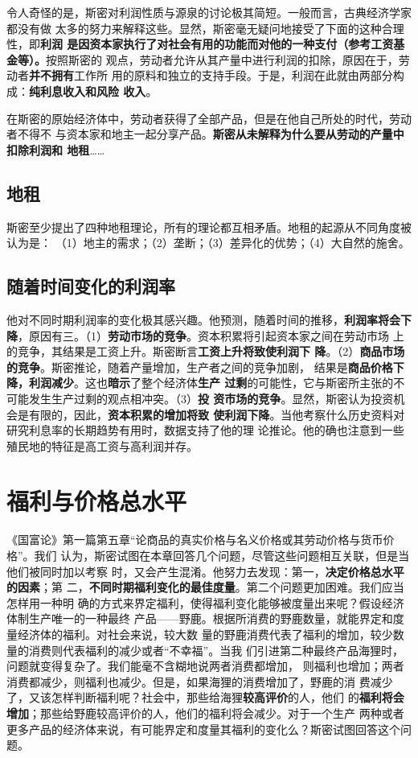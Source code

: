 令人奇怪的是，斯密对利润性质与源泉的讨论极其简短。一般而言，古典经济学家都没有做
太多的努力来解释这些。显然，斯密毫无疑问地接受了下面的这种合理性，即\textbf{利润
  是因资本家执行了对社会有用的功能而对他的一种支付（参考工资基金等）。}按照斯密的
观点，劳动者允许从其产量中进行利润的扣除，原因在于，劳动者\textbf{并不拥有}工作所
用的原料和独立的支持手段。于是，利润在此就由两部分构成：\textbf{纯利息收入和风险
  收入}。

在斯密的原始经济体中，劳动者获得了全部产品，但是在他自己所处的时代，劳动者不得不
与资本家和地主一起分享产品。\textbf{斯密从未解释为什么要从劳动的产量中扣除利润和
  地租}……

\subsection{地租}

斯密至少提出了四种地租理论，所有的理论都互相矛盾。地租的起源从不同角度被认为是：
（1）地主的需求；（2）垄断；（3）差异化的优势；（4）大自然的施舍。

\subsection{随着时间变化的利润率}

他对不同时期利润率的变化极其感兴趣。他预测，随着时间的推移，\textbf{利润率将会下
  降}，原因有三。（1）\textbf{劳动市场的竞争}。资本积累将引起资本家之间在劳动市场
上的竞争，其结果是工资上升。斯密断言\textbf{工资上升将致使利润下
  降}。（2）\textbf{商品市场的竞争}。斯密推论，随着产量增加，生产者之间的竞争加剧，
结果是\textbf{商品价格下降，利润减少}。这也\textbf{暗示}了整个经济体\textbf{生产
  过剩}的可能性，它与斯密所主张的不可能发生生产过剩的观点相冲突。（3）\textbf{投
  资市场的竞争}。显然，斯密认为投资机会是有限的，因此，\textbf{资本积累的增加将致
  使利润下降}。当他考察什么历史资料对研究利息率的长期趋势有用时，数据支持了他的理
论推论。他的确也注意到一些殖民地的特征是高工资与高利润并存。


\section{福利与价格总水平}

《国富论》第一篇第五章“论商品的真实价格与名义价格或其劳动价格与货币价格”。我们
认为，斯密试图在本章回答几个问题，尽管这些问题相互关联，但是当他们被同时加以考察
时，又会产生混淆。他努力去发现：第一，\textbf{决定价格总水平的因素}；第
二，\textbf{不同时期福利变化的最佳度量}。第二个问题更加困难。我们应当怎样用一种明
确的方式来界定福利，使得福利变化能够被度量出来呢？假设经济体制生产唯一的一种最终
产品——野鹿。根据所消费的野鹿数量，就能界定和度量经济体的福利。对社会来说，较大数
量的野鹿消费代表了福利的增加，较少数量的消费则代表福利的减少或者“不幸福”。当我
们引进第二种最终产品海狸时，问题就变得复杂了。我们能毫不含糊地说两者消费都增加，
则福利也增加；两者消费都减少，则福利也减少。但是，如果海狸的消费增加了，野鹿的消
费减少了，又该怎样判断福利呢？社会中，那些给海狸\textbf{较高评价}的人，他们
的\textbf{福利将会增加}；那些给野鹿较高评价的人，他们的福利将会减少。对于一个生产
两种或者更多产品的经济体来说，有可能界定和度量其福利的变化么？斯密试图回答这个问
题。

